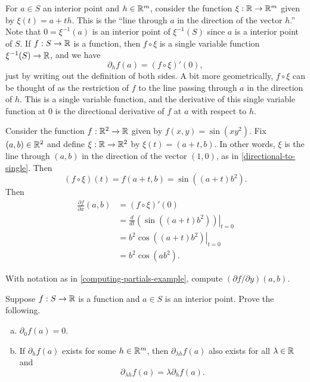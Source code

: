 \begin{remark} \label{directional-to-single}
	For $a \in S$ an interior point and $h \in \mathbb{R}^m$, consider the function $\xi : \mathbb{R} \to \mathbb{R}^m$ given by $\xi(t) = a + th$. This is the ``line through $a$ in the direction of the vector $h$.'' Note that $0 = \xi^{-1}(a)$ is an interior point of $\xi^{-1}(S)$ since $a$ is a interior point of $S$. If $f : S \to \mathbb{R}$ is a function, then $f \circ \xi$ is a single variable function $\xi^{-1}(S) \to \mathbb{R}$, and we have
	\[ \partial_h f(a) = (f \circ \xi)'(0), \]
	just by writing out the definition of both sides. A bit more geometrically, $f \circ \xi$ can be thought of as the restriction of $f$ to the line passing through $a$ in the direction of $h$. This is a single variable function, and the derivative of this single variable function at 0 is the directional derivative of $f$ at $a$ with respect to $h$. 
\end{remark}

\begin{example} \label{computing-partials-example}
	Consider the function $f : \mathbb{R}^2 \to \mathbb{R}$ given by $f(x, y) = \sin(xy^2)$. Fix $(a, b) \in \mathbb{R}^2$ and define $\xi : \mathbb{R} \to \mathbb{R}^2$ by $\xi(t) = (a + t, b)$. In other words, $\xi$ is the line through $(a, b)$ in the direction of the vector $(1,0)$, as in \cref{directional-to-single}. Then
	\[ (f \circ \xi)(t) = f(a + t, b) = \sin((a+t)b^2).  \]
	Then
	\[ \begin{aligned} \frac{\partial f}{\partial x}(a, b) &= (f \circ \xi)'(0) \\
	&= \left.\frac{d}{dt} \left(\sin((a+t)b^2) \right) \right|_{t = 0} \\
	&= \left. b^2\cos((a+t)b^2)\right|_{t = 0} \\
	&= b^2\cos(ab^2). \end{aligned}  \]
\end{example}

\begin{exercise}
	With notation as in \cref{computing-partials-example}, compute $(\partial f/\partial y)(a, b)$. 
\end{exercise}

\begin{exercise} \label{basic-directional-derivative-properties}
	Suppose $f : S \to \mathbb{R}$ is a function and $a \in S$ is an interior point. Prove the following. 
	\begin{enumerate}[(a)]
		\item $\partial_0 f(a) = 0$.  
		\item If $\partial_h f(a)$ exists for some $h \in \mathbb{R}^m$, then $\partial_{\lambda h} f(a)$ also exists for all $\lambda \in \mathbb{R}$ and \[ \partial_{\lambda h} f(a) = \lambda \partial_h f(a). \] 
	\end{enumerate}
\end{exercise}

